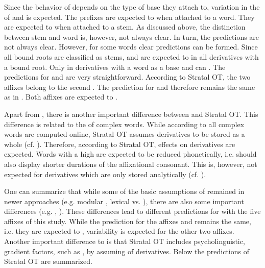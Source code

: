 Since the behavior of  depends on the type of base they attach to, variation in the  of  and  is expected. The prefixes are expected to  when attached to a word. They are expected to  when attached to a stem. As discussed above, the distinction between stem and word is, however, not always clear. In turn, the predictions are not always clear. However, for some words clear predictions can be formed. Since all bound roots are classified as stems,  and  are expected to  in all derivatives with a bound root. Only in derivatives with a word as a base  and  can .
The predictions for  and  are very straightforward. According to Stratal OT, the two affixes belong to the second . The prediction for  and  therefore remains the same as in . Both affixes are expected to .



Apart from , there is another important difference between  and Stratal OT.  This difference is related to the  of complex words. While according to  all complex words are computed online, Stratal OT assumes  derivatives to be stored as a whole (cf. \citealt[chapter 3]{BermudezOtero.2012}). Therefore, according to Stratal OT,  effects on  derivatives are expected.  Words with a high  are expected to be reduced phonetically, i.e. should also display shorter durations of the affixational consonant. This  is, however, not expected for  derivatives which are only stored analytically (cf. \citealt[chapter 3.3]{BermudezOtero.2012}). 



One can summarize that while some of the basic assumptions of  remained in newer approaches (e.g. modular , lexical vs. ), there are also some important differences (e.g. , ). These differences lead to different predictions for  with the five affixes of this study. While the prediction for the  affixes  and  remains the same, i.e. they are expected to , variability is expected for the other two affixes. Another important difference to  is that Stratal OT includes psycholinguistic, gradient factors, such as , by assuming  of  derivatives. Below the predictions of Stratal OT are summarized.\\


